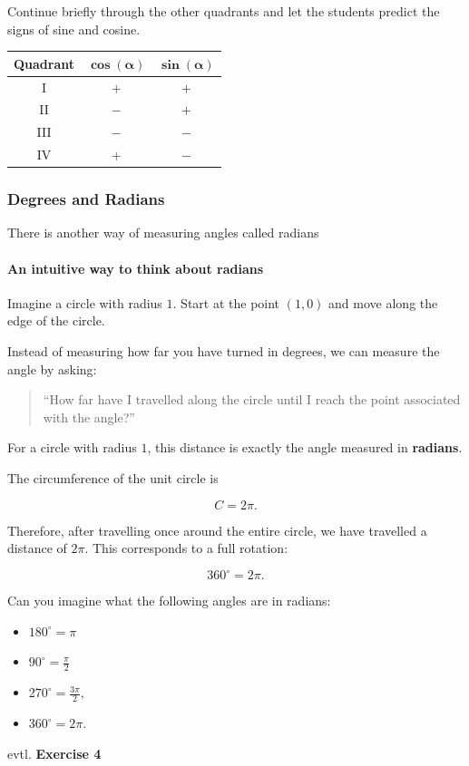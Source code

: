 \documentclass[a4paper,11pt]{article}
\begin{document}
Continue briefly through the other quadrants and let the students
predict the signs of sine and cosine.

\begin{center}
\begin{tabular}{c|c|c}
    \textbf{Quadrant} & $\boldsymbol{\cos(\alpha)}$
                      & $\boldsymbol{\sin(\alpha)}$ \\ \hline
    I   & $+$ & $+$ \\
    II  & $-$ & $+$ \\
    III & $-$ & $-$ \\
    IV  & $+$ & $-$
\end{tabular}
\end{center}

\subsubsection*{ Degrees and Radians}

There is another way of measuring angles called radians
\paragraph{An intuitive way to think about radians}

Imagine a circle with radius $1$. Start at the point $(1,0)$ and move
along the edge of the circle.

Instead of measuring how far you have turned in degrees, we can measure
the angle by asking:

\begin{quote}
    ``How far have I travelled along the circle until I reach the point associated with the angle?''
\end{quote}

For a circle with radius $1$, this distance is exactly the angle measured
in \textbf{radians}.

The circumference of the unit circle is

\begin{equation}
    C = 2\pi.
\end{equation}

Therefore, after travelling once around the entire circle, we have
travelled a distance of $2\pi$. This corresponds to a full rotation:

\begin{equation}
    360^\circ = 2\pi.
\end{equation}

Can you imagine what the following angles are in radians:
\begin{itemize}
    \item   $180^\circ = \pi$
    \item  $90^\circ = \frac{\pi}{2}$
    \item $270^\circ = \frac{3\pi}{2},$
    \item $360^\circ = 2\pi.$
\end{itemize}
    evtl. \textbf{Exercise 4}
\end{document}
